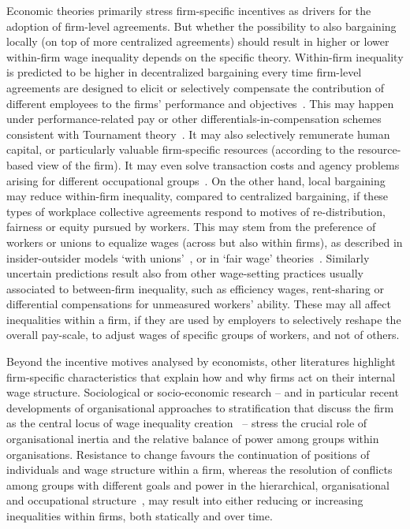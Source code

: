 \documentclass[12pt]{article}
\begin{document}
Economic theories primarily stress firm-specific incentives as drivers for the adoption of firm-level agreements. But whether the possibility to also bargaining locally (on top of more centralized agreements) should result in higher or lower within-firm wage inequality depends on the specific theory.
Within-firm inequality is predicted to be higher in decentralized bargaining every time firm-level agreements are designed to elicit or selectively compensate the contribution of different employees to the firms' performance and objectives~\citep{bayo2013diffusion}.
This may happen under performance-related pay or other differentials-in-compensation schemes consistent with Tournament theory~\citep{lazear.1979}. It may also selectively remunerate human capital, or particularly valuable firm-specific resources (according to the resource-based view of the firm). It may even solve transaction costs and agency problems arising for different occupational groups~\citep{eisenhardt1989agency,o1998structure}. On the other hand, local bargaining may reduce within-firm inequality, compared to centralized bargaining, if these types of workplace collective agreements respond to motives of re-distribution, fairness or equity pursued by workers. This may stem from the preference of workers or unions to equalize wages (across but also within firms), as described in insider-outsider models ‘with unions’~\citep{lindbeck1986wage,lindbeck2001insiders}, or in ‘fair wage’ theories~\citep{akerlof.1984}. 
Similarly uncertain predictions result also from other wage-setting practices usually associated to between-firm inequality, such as efficiency wages, rent-sharing or differential compensations for unmeasured workers' ability. These may all affect inequalities within a firm, if they are used by employers to selectively reshape the overall pay-scale, to adjust wages of specific groups of workers, and not of others.

Beyond the incentive motives analysed by economists, other literatures highlight  firm-specific characteristics that explain how and why firms act on their internal wage structure. Sociological or socio-economic research -- and in particular recent developments of organisational approaches to stratification that discuss the firm as the central locus of wage inequality creation~\citep{stainback2010,cobb2016} -- stress the crucial role of organisational inertia and the relative balance of power among groups within organisations. Resistance to change favours the continuation of positions of individuals and wage structure within a firm, whereas the resolution of conflicts among groups with different goals and power in the hierarchical, organisational and occupational structure~\citep{blau1967american, goldthorpe1972occupational, wright1980class, erikson2002intergenerational}, may result into either reducing or increasing inequalities within firms, both statically and over time. 
\end{document}
